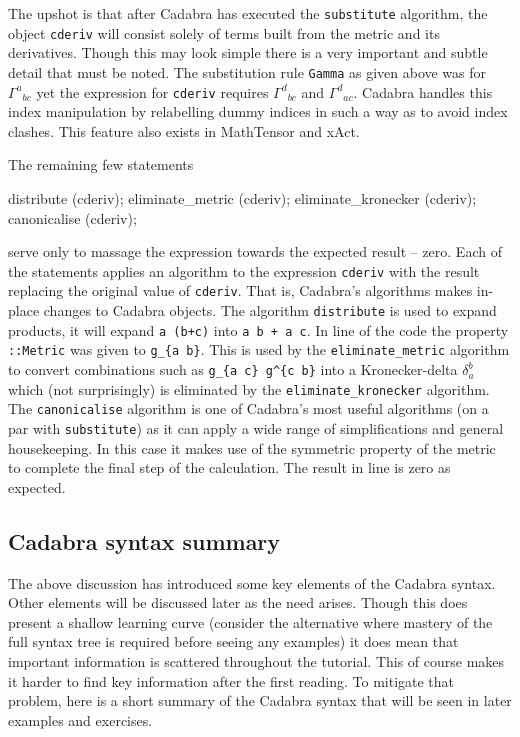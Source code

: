 \documentclass[a4paper,12pt]{article}
\numberwithin{equation}{section}%
\begin{document}
The upshot is that after Cadabra has executed the \verb|substitute| algorithm, the object
\verb|cderiv| will consist solely of terms built from the metric and its derivatives. Though
this may look simple there is a very important and subtle detail that must be noted. The
substitution rule \verb|Gamma| as given above was for $\Gamma^{a}{}_{bc}$ yet the expression
for \verb|cderiv| requires $\Gamma^{d}{}_{bc}$ and $\Gamma^{d}{}_{ac}$. Cadabra handles this
index manipulation by relabelling dummy indices in such a way as to avoid index clashes.
This feature also exists in MathTensor and xAct. %

The remaining few statements

\bgroup
\lstset{firstnumber=16}
\begin{cadabra}
   distribute          (cderiv);
   eliminate_metric    (cderiv);
   eliminate_kronecker (cderiv);
   canonicalise        (cderiv);
\end{cadabra}
\egroup

serve only to massage the expression towards the expected result -- zero. Each of the
statements applies an algorithm to the expression \verb|cderiv| with the result replacing
the original value of \verb|cderiv|. That is, Cadabra's algorithms makes in-place changes to
Cadabra objects. The algorithm \verb|distribute| is used to expand products, it will expand
\verb|a (b+c)| into \verb|a b + a c|. In line  of the code the property
\verb|::Metric| was given to \verb|g_{a b}|. This is used by the \verb|eliminate_metric|
algorithm to convert combinations such as \verb|g_{a c} g^{c b}| into a Kronecker-delta
$\delta^b_a$ which (not surprisingly) is eliminated by the \verb|eliminate_kronecker|
algorithm. The \verb|canonicalise| algorithm is one of Cadabra's most useful algorithms (on
a par with \verb|substitute|) as it can apply a wide range of simplifications and general
housekeeping. In this case it makes use of the symmetric property of the metric to complete
the final step of the calculation. The result in line  is zero as expected.

\subsection{Cadabra syntax summary}

The above discussion has introduced some key elements of the Cadabra syntax. Other elements
will be discussed later as the need arises. Though this does present a shallow learning curve
(consider the alternative where mastery of the full syntax tree is required before seeing
any examples) it does mean that important information is scattered throughout the tutorial.
This of course makes it harder to find key information after the first reading. To mitigate
that problem, here is a short summary of the Cadabra syntax that will be seen in later
examples and exercises.
\end{document}
